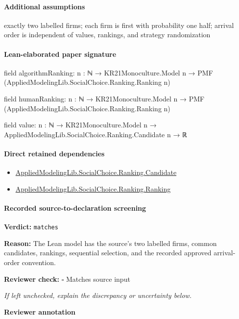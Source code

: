 \documentclass[10pt]{article}
\newcommand{\reviewerbox}{%
  \par\noindent\fbox{\parbox{0.96\linewidth}{\rule{0pt}{0.38in}}}\par
}
\newcommand{\reviewmatch}[1]{%
  \par\noindent\textbf{Reviewer check:} $\square$\; #1\par
  \noindent\emph{If left unchecked, explain the discrepancy or uncertainty below.}\par
}
\begin{document}
\paragraph{Additional assumptions}
\begin{sloppypar}
exactly two labelled firms; each firm is first with probability one half; arrival order is independent of values, rankings, and strategy randomization
\end{sloppypar}

\paragraph{Lean-elaborated paper signature}
\begin{ReviewVerbatim}
field algorithmRanking:
{n : ℕ} → KR21Monoculture.Model n → PMF (AppliedModelingLib.SocialChoice.Ranking.Ranking n)

field humanRanking:
{n : ℕ} → KR21Monoculture.Model n → PMF (AppliedModelingLib.SocialChoice.Ranking.Ranking n)

field value:
{n : ℕ} → KR21Monoculture.Model n → AppliedModelingLib.SocialChoice.Ranking.Candidate n → ℝ
\end{ReviewVerbatim}

\paragraph{Direct retained dependencies}
\begin{itemize}\raggedright
\item \hyperlink{library-prerequisite-8c0e6c25845ae78a}{Applied\allowbreak{}Modeling\allowbreak{}Lib.\allowbreak{}Social\allowbreak{}Choice.\allowbreak{}Ranking.\allowbreak{}Candidate}
\item \hyperlink{library-prerequisite-5cde54446d1ae021}{Applied\allowbreak{}Modeling\allowbreak{}Lib.\allowbreak{}Social\allowbreak{}Choice.\allowbreak{}Ranking.\allowbreak{}Ranking}
\end{itemize}
\paragraph{Recorded source-to-declaration screening}
\textbf{Verdict:} \texttt{matches}
\\
{\raggedright
\textbf{Reason:} The Lean model has the source's two labelled firms, common candidates, rankings, sequential selection, and the recorded approved arrival-\allowbreak{}order convention.\allowbreak{}
\par}
\reviewmatch{Matches source input}
\noindent\textbf{Reviewer annotation}\par
\reviewerbox
\clearpage
\hypertarget{paper-prerequisite-bd2d52e2663b165c}{}
\end{document}
